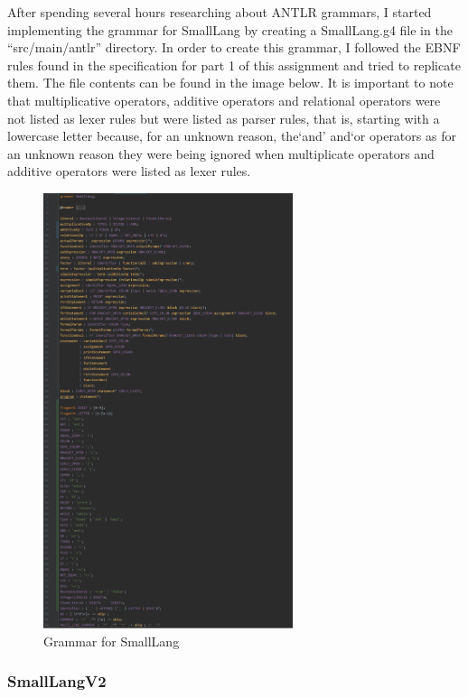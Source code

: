 \documentclass{article}
\newcommand{\quotes}[1]{``#1''}
\begin{document}
			After spending several hours researching about ANTLR grammars, I started implementing the grammar for SmallLang by creating a SmallLang.g4 file in the \quotes{src/main/antlr} directory. In order to create this grammar, I followed the EBNF rules found in the specification for part 1 of this assignment and tried to replicate them. The file contents can be found in the image below. It is important to note that multiplicative operators, additive operators and relational operators were not listed as lexer rules but were listed as parser rules, that is, starting with a lowercase letter because, for an unknown reason, the`and' and`or operators as for an unknown reason they were being ignored when multiplicate operators and additive operators were listed as lexer rules.
			
								\begin{figure}[H]
					\centering
			 			\includegraphics[width=0.65\textwidth]{smallanggr2.png}
			  			\caption{Grammar for SmallLang}
			  			\label{fig:smalllanggr}
					\end{figure}
					
			\subsubsection{SmallLangV2}
			
\end{document}

